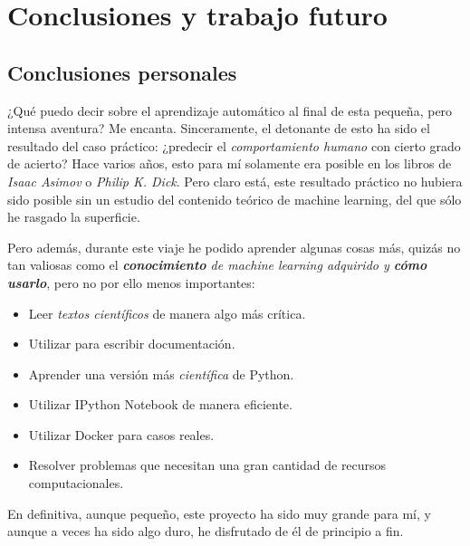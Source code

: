 \chapter{Conclusiones y trabajo futuro} \label{chap:6}

\vspace*{5mm}

\section{Conclusiones personales} \label{sec:6.1}

¿Qué puedo decir sobre el aprendizaje automático al final de esta pequeña, pero intensa aventura? Me encanta. Sinceramente, el detonante de esto ha sido el resultado del caso práctico: ¿predecir el \emph{comportamiento humano} con cierto grado de acierto? Hace varios años, esto para mí solamente era posible en los libros de \emph{Isaac Asimov} o \emph{Philip K. Dick}. Pero claro está, este resultado práctico no hubiera sido posible sin un estudio del contenido teórico de machine learning, del que sólo he rasgado la superficie.

Pero además, durante este viaje he podido aprender algunas cosas más, quizás no tan valiosas como el \emph{\textbf{conocimiento} de machine learning adquirido y \textbf{cómo usarlo}}, pero no por ello menos importantes:

\begin{itemize}
\item[\textbullet] Leer \emph{textos científicos} de manera algo más crítica.

\item[\textbullet] Utilizar  para escribir documentación.

\item[\textbullet] Aprender una versión más \emph{científica} de Python.

\item[\textbullet] Utilizar IPython Notebook de manera eficiente.

\item[\textbullet] Utilizar Docker para casos reales.

\item[\textbullet] Resolver problemas que necesitan una gran cantidad de recursos computacionales.
\end{itemize}

En definitiva, aunque pequeño, este proyecto ha sido muy grande para mí, y aunque a veces ha sido algo duro, he disfrutado de él de principio a fin.

